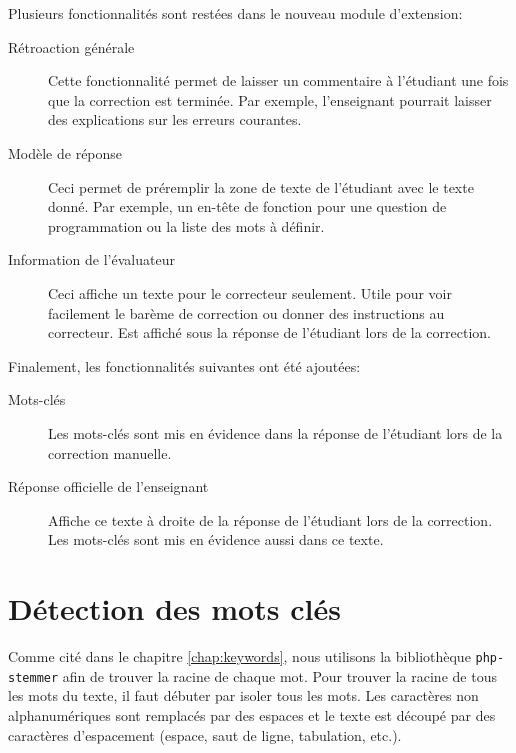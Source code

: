 Plusieurs fonctionnalités sont restées dans le nouveau module d'extension:

\begin{description}
  \item[Rétroaction générale]
  
  Cette fonctionnalit\'e permet de laisser un commentaire à l'étudiant une fois que la correction est termin\'ee.
  Par exemple, l'enseignant pourrait laisser des explications sur les erreurs courantes.
  
  \item[Modèle de réponse]
  
  Ceci permet de préremplir la zone de texte de l'étudiant avec le texte donné.
  Par exemple, un en-tête de fonction pour une question de programmation ou la liste des mots à définir.
  
  \item[Information de l'évaluateur]
  
  Ceci affiche un texte pour le correcteur seulement.
  Utile pour voir facilement le barème de correction ou donner des instructions au correcteur.
  Est affiché sous la réponse de l'étudiant lors de la correction.
\end{description}

Finalement, les fonctionnalités suivantes ont été ajoutées:

\begin{description}
  \item[Mots-clés]
  
  Les mots-clés sont mis en évidence dans la réponse de l'étudiant lors de la correction manuelle.

  \item[Réponse officielle de l'enseignant]
  
  Affiche ce texte à droite de la réponse de l'étudiant lors de la correction.
  Les mots-clés sont mis en évidence aussi dans ce texte.
\end{description}

\section{Détection des mots clés}

Comme cité dans le chapitre \autoref{chap:keywords}, nous utilisons la biblioth\`eque \texttt{php-stemmer} afin de trouver la racine de chaque mot.
Pour trouver la racine de tous les mots du texte, il faut débuter par isoler tous les mots.
Les caractères non alphanumériques sont remplacés par des espaces et le texte est découpé par des caractères d'espacement (espace, saut de ligne, tabulation, etc.).

